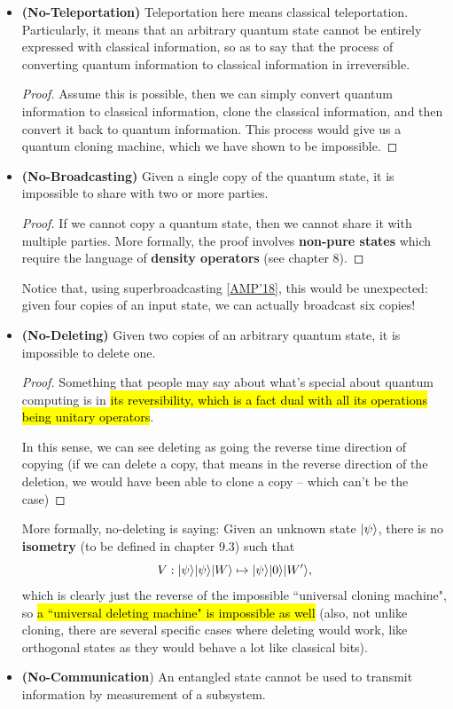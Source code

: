 \documentclass[12pt]{article}
\begin{document}
\begin{itemize}
    \item \textbf{(No-Teleportation)} Teleportation here means classical teleportation. Particularly, it means that an arbitrary quantum state cannot be entirely expressed with classical information, so as to say that the process of converting quantum information to classical information in irreversible.
    \begin{proof}
        Assume this is possible, then we can simply convert quantum information to classical information, clone the classical information, and then convert it back to quantum information. This process would give us a quantum cloning machine, which we have shown to be impossible.
    \end{proof}
    \item \textbf{(No-Broadcasting)} Given a single copy of the quantum state, it is impossible to share with two or more parties.
    \begin{proof}
        If we cannot copy a quantum state, then we cannot share it with multiple parties. More formally, the proof involves \textbf{non-pure states} which require the language of \textbf{density operators} (see chapter 8).
    \end{proof}

    Notice that, using superbroadcasting [\href{https://arxiv.org/pdf/quant-ph/0506251.pdf}{AMP'18}], this would be unexpected: given four copies of an input state, we can actually broadcast six copies!
    \item \textbf{(No-Deleting)} Given two copies of an arbitrary quantum state, it is impossible to delete one.

    \begin{proof}
    Something that people may say about what's special about quantum computing is in \hl{its reversibility, which is a fact dual with all its operations being unitary operators}.
    
    In this sense, we can see deleting as going the reverse time direction of copying (if we can delete a copy, that means in the reverse direction of the deletion, we would have been able to clone a copy -- which can't be the case)
    \end{proof}

    More formally, no-deleting is saying: Given an unknown state $\Ket{\psi}$, there is no \textbf{isometry} (to be defined in chapter 9.3) such that $$
    V: \Ket{\psi}\Ket{\psi}\Ket{W}\mapsto \Ket{\psi}\Ket{0}\Ket{W'},
    $$ which is clearly just the reverse of the impossible ``universal cloning machine", so \hl{a ``universal deleting machine" is impossible as well} (also, not unlike cloning, there are several specific cases where deleting would work, like orthogonal states as they would behave a lot like classical bits).
    \item \textbf{(No-Communication}) An entangled state cannot be used to transmit information by measurement of a subsystem.


\end{itemize}
\end{document}
